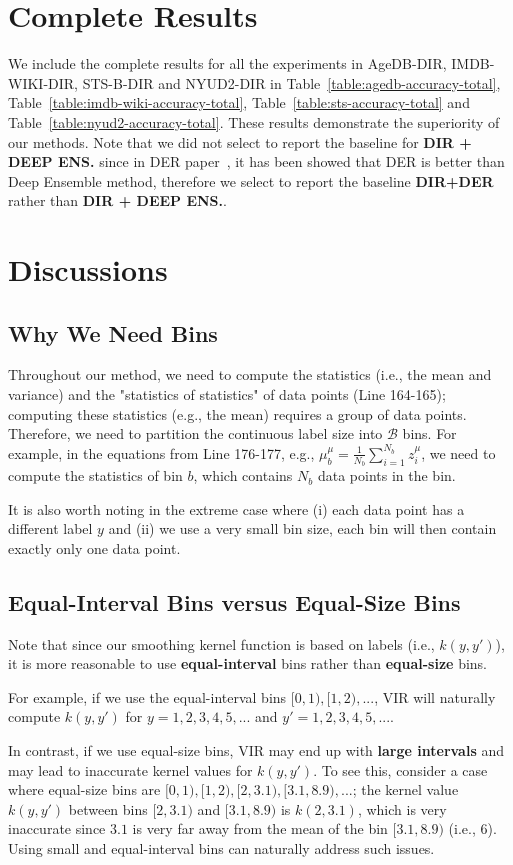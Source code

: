 \section{Complete Results}
We include the complete results for all the experiments in AgeDB-DIR, IMDB-WIKI-DIR, STS-B-DIR and NYUD2-DIR in Table~\ref{table:agedb-accuracy-total}, Table~\ref{table:imdb-wiki-accuracy-total}, Table~\ref{table:sts-accuracy-total} and Table~\ref{table:nyud2-accuracy-total}. These results demonstrate the superiority of our methods. {Note that we did not select to report the baseline for \textbf{DIR + DEEP ENS.} since in DER paper~\citep{DER}, it has been showed that DER is better than Deep Ensemble method, therefore we select to report the baseline \textbf{DIR+DER} rather than \textbf{DIR + DEEP ENS.}.}

\section{Discussions}
\subsection{Why We Need Bins}
Throughout our method, we need to compute the statistics (i.e., the mean and variance) and the "statistics of statistics" of data points (Line 164-165); computing these statistics (e.g., the mean) requires a group of data points. Therefore, we need to partition the continuous label size into $\mathcal{B}$ bins. For example, in the equations from Line 176-177, e.g., $\mu_b^{\mu} = \frac{1}{N_b} \sum\nolimits^{N_b}_{i=1} z_i^{\mu}$, we need to compute the statistics of bin $b$, which contains $N_b$ data points in the bin.

It is also worth noting in the extreme case where (i) each data point has a different label $y$ and (ii) we use a very small bin size, each bin will then contain exactly only one data point. 

\subsection{Equal-Interval Bins versus Equal-Size Bins}
Note that since our smoothing kernel function is based on labels (i.e., $k(y, y')$), it is more reasonable to use \textbf{equal-interval} bins rather than \textbf{equal-size} bins.

\begin{compactitem}
\item For example, if we use the equal-interval bins $[0,1),[1,2),...$, VIR will naturally compute $k(y, y')$ for $y=1,2,3,4,5,...$ and $y'=1,2,3,4,5,...$. 
\item In contrast, if we use equal-size bins, VIR may end up with \textbf{large intervals} and may lead to inaccurate kernel values for $k(y, y')$. To see this, consider a case where equal-size bins are $[0,1),[1,2),[2,3.1),[3.1,8.9),...$; the kernel value $k(y, y')$ between bins $[2,3.1)$ and $[3.1,8.9)$ is $k(2,3.1)$, which is very inaccurate since $3.1$ is very far away from the mean of the bin $[3.1,8.9)$ (i.e., $6$). Using small and equal-interval bins can naturally address such issues.
\end{compactitem}


